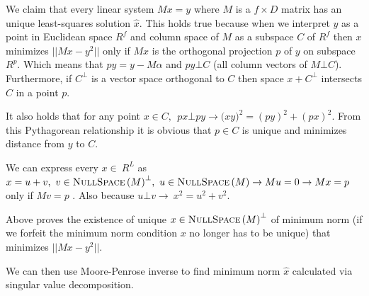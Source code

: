 We claim that every linear system $Mx=y$ where $M$ is a $f\times D$ matrix has an unique least-squares solution $\hat{x}$.\cite{gallier2020algebra} This holds true because when we interpret $y$ as a point in Euclidean space $R^f$ and column space of $M$ as a subspace $C$ of $R^f$ then $x$ minimizes $||Mx-y^2||$ only if $Mx$ is the orthogonal projection $p$ of $y$ on subspace $R^p$. Which means that $py=y-M\alpha$ and $py\bot C$ (all column vectors of $M\bot C$). Furthermore, if $C^\bot$ is a vector space orthogonal to $C$ then space $x+C^\bot$ intersects $C$ in a point $p$.

It also holds that for any point $x\in C,\ \ px\bot py\rightarrow({xy)}^2=\left(py\right)^2+\left(px\right)^2$. From this Pythagorean relationship it is obvious that $p\in C$ is unique and minimizes distance from $y$ to $C$.

We can express every $x\in\ R^L$ as $x=u+v,\ v\in{\textsc{NullSpace}\left(M\right)}^\bot,\ u\in \textsc{NullSpace}\left(M\right)\rightarrow Mu=0\rightarrow Mx=p$ only if $Mv=p$ . Also because $u\bot v\rightarrow{\ x}^2=u^2+v^2$.

Above proves the existence of unique $x\in{\textsc{NullSpace}\left(M\right)}^\bot$ of minimum norm (if we forfeit the minimum norm condition $x$ no longer has to be unique) that minimizes $||Mx-y^2||$. 

We can then use Moore-Penrose inverse to find minimum norm $\hat{x}$ calculated via singular value decomposition.\cite{gallier2020algebra}

